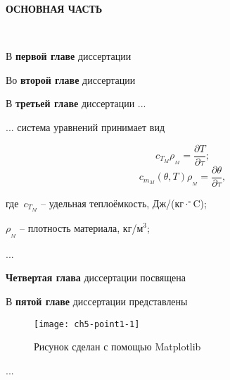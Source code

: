 %
\begin{center}
\textbf{ОСНОВНАЯ ЧАСТЬ}
\end{center}

~

В \textbf{первой главе} диссертации 



Во \textbf{второй главе} диссертации 



В \textbf{третьей главе} диссертации ...

\noindent ... система уравнений принимает вид

\vspace{-10pt}
\begin{equation}\label{eq:tempUn3d}
c_{T_M}\rho_{_M} = \frac{\partial T}{\partial \tau }
;
\end{equation}
\begin{equation}\label{eq:thetaUn3d}
c_{m_M}\!(\!\theta,T\!)\!\rho_{_M}\! = \frac{\partial \theta }{\partial \tau },
\end{equation}



\noindent где~$c_{T_M}$ -- удельная теплоёмкость, Дж/(кг$\cdot^\circ$C);

\hspace{1mm}$\rho_{_M}$ -- плотность материала, кг/м$^3$;

...




\textbf{Четвертая глава} диссертации посвящена 



В \textbf{пятой главе} диссертации представлены



\vspace{-10pt}
\begin{figure}[h!]
\begin{center}
\texttt{[image: ch5-point1-1]}\\[2mm]
\vspace{-10pt}
\caption {Рисунок сделан с помощью Matplotlib}\label{img:point1-1}
\end{center}
\end{figure}

...

